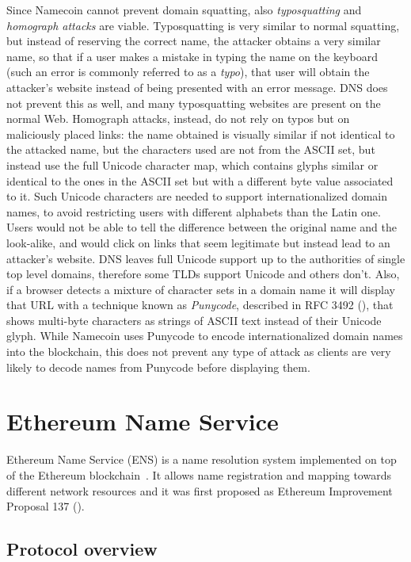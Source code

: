 \documentclass[mscthesis]{usiinfthesis}
\begin{document}
Since Namecoin cannot prevent domain squatting, also \emph{typosquatting} and \emph{homograph attacks} are viable. Typosquatting is very similar to normal squatting, but instead of reserving the correct name, the attacker obtains a very similar name, so that if a user makes a mistake in typing the name on the keyboard (such an error is commonly referred to as a \emph{typo}), that user will obtain the attacker's website instead of being presented with an error message. DNS does not prevent this as well, and many typosquatting websites are present on the normal Web. Homograph attacks, instead, do not rely on typos but on maliciously placed links: the name obtained is visually similar if not identical to the attacked name, but the characters used are not from the ASCII set, but instead use the full Unicode character map, which contains glyphs similar or identical to the ones in the ASCII set but with a different byte value associated to it. Such Unicode characters are needed to support internationalized domain names, to avoid restricting users with different alphabets than the Latin one. Users would not be able to tell the difference between the original name and the look-alike, and would click on links that seem legitimate but instead lead to an attacker's website. DNS leaves full Unicode support up to the authorities of single top level domains, therefore some TLDs support Unicode and others don't. Also, if a browser detects a mixture of character sets in a domain name it will display that URL with a technique known as \emph{Punycode}, described in RFC 3492 (\cite{rfc:3492}), that shows multi-byte characters as strings of ASCII text instead of their Unicode glyph. While Namecoin uses Punycode to encode internationalized domain names into the blockchain, this does not prevent any type of attack as clients are very likely to decode names from Punycode before displaying them.%

\section{Ethereum Name Service}\label{proj:ens}

Ethereum Name Service (ENS) is a name resolution system implemented on top of the Ethereum blockchain~\cite{}. It allows name registration and mapping towards different network resources and it was first proposed as Ethereum Improvement Proposal 137 (\cite{eip:137}).

\subsection{Protocol overview}
\end{document}
